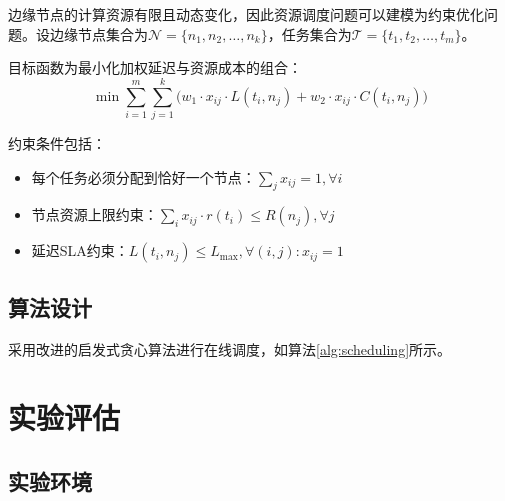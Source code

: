 \documentclass[twocolumn]{harryopo-paper}
\begin{document}
边缘节点的计算资源有限且动态变化，因此资源调度问题可以建模为约束优化问题。设边缘节点集合为$\mathcal{N} = \{n_1, n_2, \dots, n_k\}$，任务集合为$\mathcal{T} = \{t_1, t_2, \dots, t_m\}$。

目标函数为最小化加权延迟与资源成本的组合：
\begin{equation}
\min \sum_{i=1}^{m} \sum_{j=1}^{k} \bigl(w_1 \cdot x_{ij} \cdot L(t_i, n_j) + w_2 \cdot x_{ij} \cdot C(t_i, n_j)\bigr)
\label{eq:objective}
\end{equation}

约束条件包括：
\begin{itemize}
    \item 每个任务必须分配到恰好一个节点：$\sum_{j} x_{ij} = 1, \forall i$
    \item 节点资源上限约束：$\sum_{i} x_{ij} \cdot r(t_i) \leq R(n_j), \forall j$
    \item 延迟SLA约束：$L(t_i, n_j) \leq L_{\max}, \forall (i,j): x_{ij}=1$
\end{itemize}

\subsection{算法设计}

采用改进的启发式贪心算法进行在线调度，如算法\ref{alg:scheduling}所示。

\begin{algorithm}[t]
\caption{在线动态资源调度算法}
\label{alg:scheduling}

\BlankLine
{}
\end{algorithm}

\section{实验评估}

\subsection{实验环境}
\end{document}
